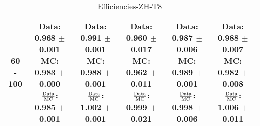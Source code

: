 \documentclass[final,letterpaper,twoside,12pt]{article}
\begin{document}
\begin{table}[htbp]
\begin{adjustwidth}{-4em}{-4em}
\begin{tabular}{|c|c|c|c|c|c|}
60 - 100 & \parbox[c]{1.1 in}{ \scriptsize  Data: 0.968 $\pm$ 0.001 \newline MC: 0.983 $\pm$ 0.000 \newline $\frac{\rm{Data}}{\rm{MC}}$: 0.985 $\pm$ 0.001} & \parbox[c]{1.1 in}{ \scriptsize  Data: 0.991 $\pm$ 0.001 \newline MC: 0.988 $\pm$ 0.001 \newline $\frac{\rm{Data}}{\rm{MC}}$: 1.002 $\pm$ 0.001} & \parbox[c]{1.1 in}{ \scriptsize  Data: 0.960 $\pm$ 0.017 \newline MC: 0.962 $\pm$ 0.011 \newline $\frac{\rm{Data}}{\rm{MC}}$: 0.999 $\pm$ 0.021} & \parbox[c]{1.1 in}{ \scriptsize  Data: 0.987 $\pm$ 0.006 \newline MC: 0.989 $\pm$ 0.001 \newline $\frac{\rm{Data}}{\rm{MC}}$: 0.998 $\pm$ 0.006} & \parbox[c]{1.1 in}{ \scriptsize  Data: 0.988 $\pm$ 0.007 \newline MC: 0.982 $\pm$ 0.008 \newline $\frac{\rm{Data}}{\rm{MC}}$: 1.006 $\pm$ 0.011}\\ \hline 
\end{tabular}
\caption {Efficiencies-ZH-T8}
\label{tab:cqdata0}
\end{adjustwidth}\end{table}
\end{document}
